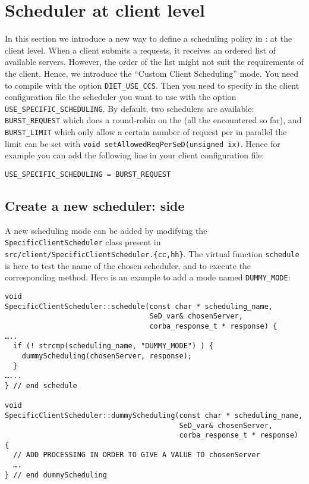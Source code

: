 \section{Scheduler at client level}

In this section we introduce a new way to define a scheduling policy
in \diet: at the client level. When a client submits a requests, it
receives an ordered list of available servers. However, the order of
the list might not suit the requirements of the client. Hence, we
introduce the ``Custom Client Scheduling'' mode. You need to compile
\diet with the option \texttt{DIET\_USE\_CCS}. Then you need to specify
in the client configuration file the scheduler you want to use with
the option \texttt{USE\_SPECIFIC\_SCHEDULING}. By
default, two schedulers are available: \texttt{BURST\_REQUEST} which
does a round-robin on the \sed (all the encountered \sed so far), and
\texttt{BURST\_LIMIT} which only allow a certain number of request per
\sed in parallel the limit can be set with
\verb|void setAllowedReqPerSeD(unsigned ix)|.
Hence for example you can add the following line in your client
configuration file:
\begin{verbatim}
USE_SPECIFIC_SCHEDULING = BURST_REQUEST
\end{verbatim}



\subsection{Create a new scheduler: \diet side}


A new scheduling mode can be added by modifying the
\texttt{SpecificClientScheduler} class present in
\texttt{src/client/SpecificClientScheduler.\{cc,hh\}}.
The virtual function \texttt{schedule} is here to test the name of the
chosen scheduler, and to execute the corresponding method.
Here is an example to add a mode named \texttt{DUMMY\_MODE}:
\begin{verbatim}
void
SpecificClientScheduler::schedule(const char * scheduling_name,
                                  SeD_var& chosenServer,
                                  corba_response_t * response) {
…..
  if (! strcmp(scheduling_name, "DUMMY_MODE") ) {
    dummyScheduling(chosenServer, response);
  }
…...
} // end schedule

void
SpecificClientScheduler::dummyScheduling(const char * scheduling_name,
                                         SeD_var& chosenServer,
                                         corba_response_t * response) {
  // ADD PROCESSING IN ORDER TO GIVE A VALUE TO chosenServer
  ….
} // end dummyScheduling
\end{verbatim}


